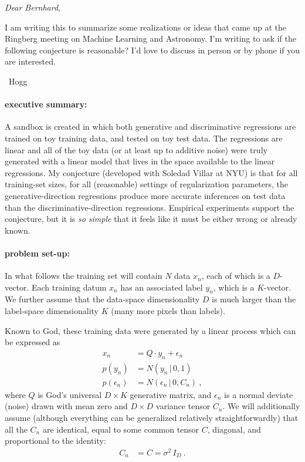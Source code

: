 \documentclass[12pt]{article}
\newcommand{\given}{\,|\,}
\begin{document}
\noindent
{\slshape Dear Bernhard,

I am writing this to summarize some realizations or ideas that came up
at the Ringberg meeting on Machine Learning and Astronomy. I'm writing
to ask if the following conjecture is reasonable? I'd love to discuss
in person or by phone if you are interested.

~\hfill Hogg}

\paragraph{executive summary:}
A sandbox is created in which both generative and discriminative
regressions are trained on toy training data, and tested on toy test
data.
The regressions are linear and all of the toy data (or at least up to
additive noise) were truly generated with a linear model that lives in
the space available to the linear regressions.
My conjecture (developed with Soledad Villar at NYU) is that for all
training-set sizes, for all (reasonable) settings of regularization parameters,
the generative-direction regressions produce more accurate inferences on
test data than the discriminative-direction regressions.
Empirical experiments support the conjecture, but it is \emph{so simple}
that it feels like it must be either wrong or already known.

\paragraph{problem set-up:}
In what follows the training set will contain $N$ data $x_n$, each of
which is a $D$-vector.
Each training datum $x_n$ has an associated label $y_n$, which is a
$K$-vector.
We further assume that the data-space dimensionality $D$ is much larger
than the label-space dimensionality $K$ (many more pixels than labels).

Known to God, these training data were generated by a linear process
which can be expressed as
\begin{align}
x_n &= Q \cdot y_n + \epsilon_n \\
p(y_n) &= N(y_n\given 0, 1) \\
p(\epsilon_n) &= N(\epsilon_n\given 0, C_n)
~,
\end{align}
where $Q$ is God's universal $D\times K$ generative matrix, and
$\epsilon_n$ is a normal deviate (noise) drawn with mean zero and
$D\times D$ variance tensor $C_n$.
We will additionally assume (although everything can be generalized
relatively straightforwardly) that all the $C_n$ are identical, equal
to some common tensor $C$, diagonal, and proportional to the identity:
\begin{align}
C_n &= C = \sigma^2\,I_D
~.
\end{align}
\end{document}
